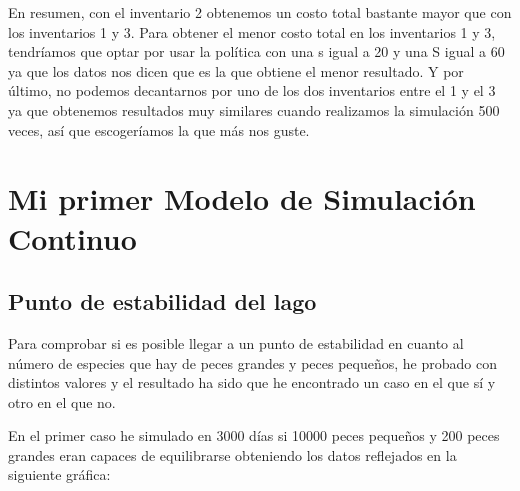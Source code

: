 \documentclass[11pt,a4paper]{report}
\begin{document}
En resumen, con el inventario 2 obtenemos un costo total bastante mayor que con los inventarios 1 y 3. Para obtener el menor costo total en los inventarios 1 y 3, tendríamos que optar por usar la política con una s igual a 20 y una S igual a 60 ya que los datos nos dicen que es la que obtiene el menor resultado. Y por último, no podemos decantarnos por uno de los dos inventarios entre el 1 y el 3 ya que obtenemos resultados muy similares cuando realizamos la simulación 500 veces, así que escogeríamos la que más nos guste.

\newpage
\chapter{Mi primer Modelo de Simulación Continuo}
\newpage
\section{Punto de estabilidad del lago}
Para comprobar si es posible llegar a un punto de estabilidad en cuanto al número de especies que hay de peces grandes y peces pequeños, he probado con distintos valores y el resultado ha sido que he encontrado un caso en el que sí y otro en el que no. 

En el primer caso he simulado en 3000 días si 10000 peces pequeños y 200 peces grandes eran capaces de equilibrarse obteniendo los datos reflejados en la siguiente gráfica:
\end{document}
